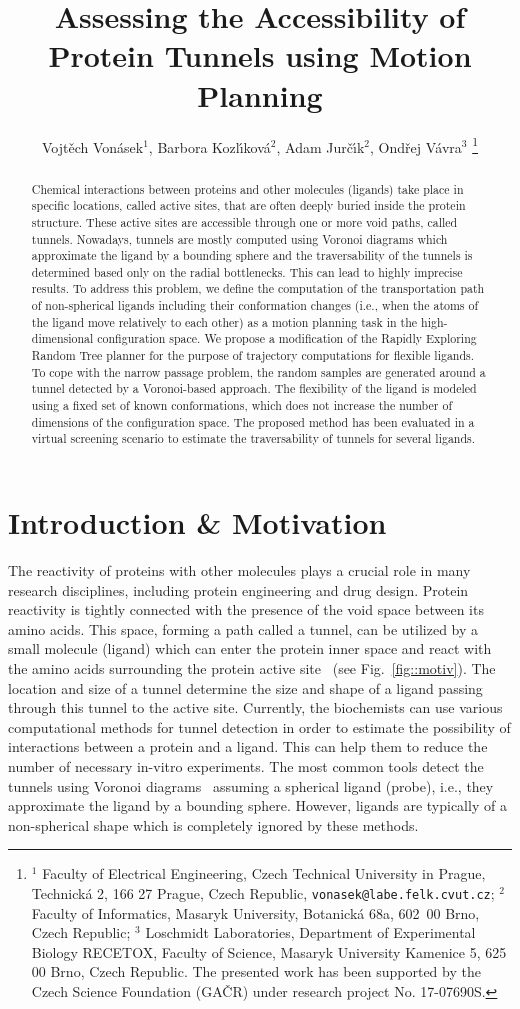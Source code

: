 \documentclass[usletter, 10pt, conference]{ieeeconf} %
\title{Assessing the Accessibility of Protein Tunnels using Motion Planning}
\author{Vojt\v ech Von\' asek$^{1}$,
    Barbora Kozl\'\i kov\'a$^{2}$,
    Adam Jur\v{c}\'\i k$^{2}$,
    Ond\v{r}ej V\'{a}vra$^{3}$
\thanks{$^{1}$ Faculty of Electrical Engineering,  Czech Technical University in Prague, 
Technick\'a 2, 166 27 Prague, Czech Republic, {\tt vonasek@labe.felk.cvut.cz};
$^{2}$ Faculty of Informatics, Masaryk University, Botanick\'a 68a, 602~00 Brno, Czech Republic;
$^{3}$ Loschmidt Laboratories, Department of Experimental Biology RECETOX, Faculty of Science, Masaryk University
    Kamenice 5, 625 00 Brno, Czech Republic. 
The presented work has been supported by the Czech Science Foundation (GA{\v C}R) under research project No. 17-07690S.
}}
\begin{document}
\maketitle
\thispagestyle{empty}
\pagestyle{empty}

\begin{abstract}
Chemical interactions between proteins and other molecules (ligands) take place in specific locations, called active sites, that are often deeply buried inside the protein structure.
These active sites are accessible through one or more void paths, called tunnels.
Nowadays, tunnels are mostly computed using Voronoi diagrams which approximate the ligand by a bounding sphere and 
the traversability of the tunnels is determined based only on the radial bottlenecks.
This can lead to highly imprecise results.
To address this problem, we define the computation of the transportation path of non-spherical ligands including their conformation changes (i.e., when the atoms of the ligand move relatively to each other) as a motion planning task in the high-dimensional configuration space.
We propose a modification of the Rapidly Exploring Random Tree planner for the purpose of trajectory computations for flexible ligands.
To cope with the narrow passage problem, the random samples are generated around a tunnel detected by a Voronoi-based approach.
The flexibility of the ligand is modeled using a fixed set of known conformations, which does not increase the number of dimensions of the configuration space.
The proposed method has been evaluated in a virtual screening scenario to estimate the traversability of tunnels for several ligands.
\end{abstract}


\section{Introduction \& Motivation}


The reactivity of proteins with other molecules plays a crucial role in many research disciplines, including protein engineering and drug design.
Protein reactivity is tightly connected with the presence of the void space between its amino acids. 
This space, forming a path called a tunnel, can be utilized by a small molecule (ligand) which can enter the protein inner space and react with the amino acids surrounding the protein active site~\cite{gora2013gates} (see Fig.~\ref{fig::motiv}).
The location and size of a tunnel determine the size and shape of a ligand passing through this tunnel to the active site.
Currently, the biochemists can use various computational methods for tunnel detection in order to estimate the possibility of interactions between a protein and a ligand.
This can help them to reduce the number of necessary in-vitro experiments.
The most common tools detect the tunnels using Voronoi diagrams~\cite{yaffe2008,caver3} assuming a spherical ligand (probe), 
i.e., they approximate the ligand by a bounding sphere.
However, ligands are typically of a non-spherical shape which is completely ignored by these methods. 
\end{document}
